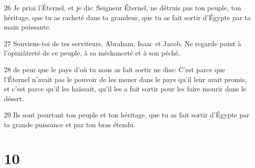 \par 26 Je priai l'Éternel, et je dis: Seigneur Éternel, ne détruis pas ton peuple, ton héritage, que tu as racheté dans ta grandeur, que tu as fait sortir d'Égypte par ta main puissante.
\par 27 Souviens-toi de tes serviteurs, Abraham, Isaac et Jacob. Ne regarde point à l'opiniâtreté de ce peuple, à sa méchanceté et à son péché,
\par 28 de peur que le pays d'où tu nous as fait sortir ne dise: C'est parce que l'Éternel n'avait pas le pouvoir de les mener dans le pays qu'il leur avait promis, et c'est parce qu'il les haïssait, qu'il les a fait sortir pour les faire mourir dans le désert.
\par 29 Ils sont pourtant ton peuple et ton héritage, que tu as fait sortir d'Égypte par ta grande puissance et par ton bras étendu.

\chapter{10}

